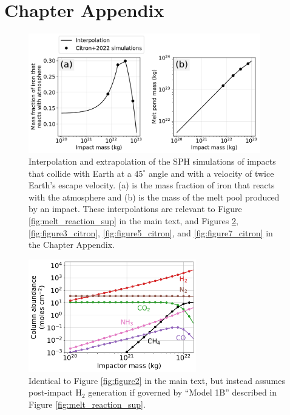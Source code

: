 \section{Chapter Appendix} \label{sec:impacts_appendix}

\begin{figure}
  \centering
  \includegraphics[width=0.9\textwidth]{tex/5impacts/figures/supplement/citron_interpolations.pdf}
  \caption{Interpolation and extrapolation of the \citet{Citron_2022} SPH simulations of impacts that collide with Earth at a $45^\circ$ angle and with a velocity of twice Earth's escape velocity. (a) is the mass fraction of iron that reacts with the atmosphere and (b) is the mass of the melt pool produced by an impact.  These interpolations are relevant to Figure \ref{fig:melt_reaction_sup} in the main text, and Figures \ref{fig:figure2_citron}, \ref{fig:figure3_citron}, \ref{fig:figure5_citron}, and \ref{fig:figure7_citron} in the Chapter Appendix.}
  \label{fig:citron_interpolations}
\end{figure}

\begin{figure}
  \centering
  \includegraphics[width=0.65\textwidth]{tex/5impacts/figures/supplement/Figure2_Citron.pdf}
  \caption{Identical to Figure \ref{fig:figure2} in the main text, but instead assumes post-impact H$_2$ generation if governed by ``Model 1B'' described in Figure \ref{fig:melt_reaction_sup}.}
  \label{fig:figure2_citron}
\end{figure}

